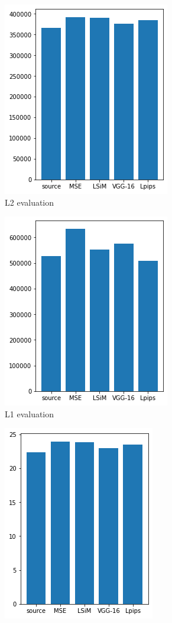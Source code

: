 \documentclass[a4paper,12pt,twoside]{report}
\begin{document}
\begin{figure}
	\centering
	\begin{subfigure}{0.32\textwidth}
		\centering
		\includegraphics[scale=0.48]{buoyancy_test/l2.png}
		\caption{L2 evaluation}
	\end{subfigure}
	\begin{subfigure}{0.32\textwidth}
		\centering
		\includegraphics[scale=0.48]{buoyancy_test/l1.png}
		\caption{L1 evaluation}
	\end{subfigure}
	\begin{subfigure}{0.32\textwidth}
		\centering
		\includegraphics[scale=0.48]{buoyancy_test/mse.png}

\end{subfigure}
\end{figure}
\end{document}
